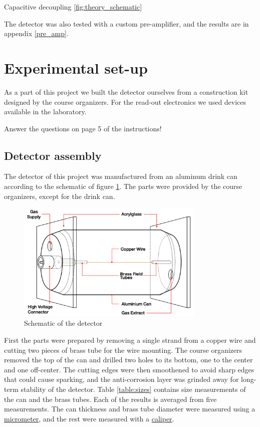 \documentclass[a4paper]{article}
\begin{document}
Capacitive decoupling \ref{fig:theory_schematic}

The detector was also tested with a custom pre-amplifier, and the results are in appendix \ref{pre_amp}.
\fi


\clearpage
\section{Experimental set-up}
\label{setup}
As a part of this project we built the detector ourselves from a construction kit designed by the course organizers.
For the read-out electronics we used devices available in the laboratory.

Answer the questions on page 5 of the instructions!


\subsection{Detector assembly}
\label{assembly}
The detector of this project was manufactured from an aluminum drink can according to the schematic of figure \ref{fig:schematic}.
The parts were provided by the course organizers, except for the drink can.

\begin{figure}[ht!]
\centering
\includegraphics[width=0.8\textwidth]{fig/instructions/schematic.png}
\caption{Schematic of the detector \cite{instructions}}
\label{fig:schematic}
\end{figure}

First the parts were prepared by removing a single strand from a copper wire and cutting two pieces of brass tube for the wire mounting.
The course organizers removed the top of the can and drilled two holes to its bottom, one to the center and one off-center.
The cutting edges were then smoothened to avoid sharp edges that could cause sparking, and the anti-corrosion layer was grinded away for long-term stability of the detector.
Table \ref{table:sizes} contains size measurements of the can and the brass tubes.
Each of the results is averaged from five measurements.
The can thickness and brass tube diameter were measured using a
\href{https://en.wikipedia.org/wiki/Micrometer}{micrometer}, and the rest were measured with a
\href{https://en.wikipedia.org/wiki/Calipers}{caliper}.
\end{document}
